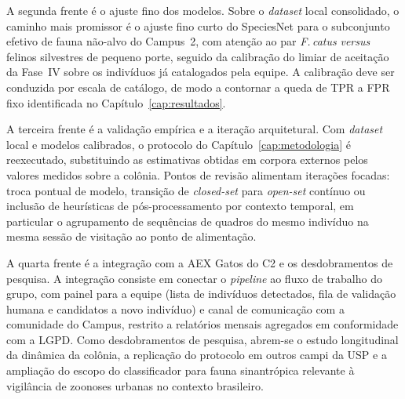 A segunda frente é o ajuste fino dos modelos. Sobre o \textit{dataset} local consolidado, o caminho mais promissor é o ajuste fino curto do SpeciesNet para o subconjunto efetivo de fauna não-alvo do Campus~2, com atenção ao par \textit{F.\,catus} \textit{versus} felinos silvestres de pequeno porte, seguido da calibração do limiar de aceitação da Fase~IV sobre os indivíduos já catalogados pela equipe. A calibração deve ser conduzida por escala de catálogo, de modo a contornar a queda de TPR a FPR fixo identificada no Capítulo~\ref{cap:resultados}.

A terceira frente é a validação empírica e a iteração arquitetural. Com \textit{dataset} local e modelos calibrados, o protocolo do Capítulo~\ref{cap:metodologia} é reexecutado, substituindo as estimativas obtidas em corpora externos pelos valores medidos sobre a colônia. Pontos de revisão alimentam iterações focadas: troca pontual de modelo, transição de \textit{closed-set} para \textit{open-set} contínuo ou inclusão de heurísticas de pós-processamento por contexto temporal, em particular o agrupamento de sequências de quadros do mesmo indivíduo na mesma sessão de visitação ao ponto de alimentação.

A quarta frente é a integração com a AEX Gatos do C2 e os desdobramentos de pesquisa. A integração consiste em conectar o \textit{pipeline} ao fluxo de trabalho do grupo, com painel para a equipe (lista de indivíduos detectados, fila de validação humana e candidatos a novo indivíduo) e canal de comunicação com a comunidade do Campus, restrito a relatórios mensais agregados em conformidade com a LGPD. Como desdobramentos de pesquisa, abrem-se o estudo longitudinal da dinâmica da colônia, a replicação do protocolo em outros campi da USP e a ampliação do escopo do classificador para fauna sinantrópica relevante à vigilância de zoonoses urbanas no contexto brasileiro.

